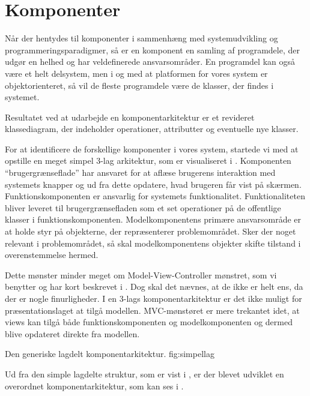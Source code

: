 \section{Komponenter}
\label{sec:komponenter}
Når der hentydes til komponenter i sammenhæng med systemudvikling og programmeringsparadigmer, så er en komponent en samling af programdele, der udgør en helhed og har veldefinerede ansvarsområder\cite[s.~191]{ooad}. En programdel kan også være et helt delsystem, men i og med at platformen for vores system er objektorienteret, så vil de fleste programdele være de klasser, der findes i systemet. 

Resultatet ved at udarbejde en komponentarkitektur er et revideret klassediagram, der indeholder operationer, attributter og eventuelle nye klasser.

For at identificere de forskellige komponenter i vores system, startede vi med at opstille en meget simpel 3-lag arkitektur\cite{Eckerson1995}, som er visualiseret i . 
Komponenten ``brugergrænseflade'' har ansvaret for at aflæse brugerens interaktion med systemets knapper og ud fra dette opdatere, hvad brugeren får vist på skærmen. 
Funktionskomponenten er ansvarlig for systemets funktionalitet. Funktionaliteten bliver leveret til brugergrænsefladen som et set operationer på de offentlige klasser i funktionskomponenten. 
Modelkomponentens primære ansvarsområde er at holde styr på objekterne, der repræsenterer problemområdet. Sker der noget relevant i problemområdet, så skal modelkomponentens objekter skifte tilstand i overenstemmelse hermed. 

Dette mønster minder meget om Model-View-Controller mønstret, som vi benytter og har kort beskrevet i . Dog skal det nævnes, at de ikke er helt ens, da der er nogle finurligheder. I en 3-lags komponentarkitektur er det ikke muligt for præsentationslaget at tilgå modellen. MVC-mønstøret er mere trekantet idet, at views kan tilgå både funktionskomponenten og modelkomponenten og dermed blive opdateret direkte fra modellen. 

	{Den generiske lagdelt komponentarkitektur.}
	{fig:simpellag}

Ud fra den simple lagdelte struktur, som er vist i , er der blevet udviklet en overordnet komponentarkitektur, som kan ses i .




